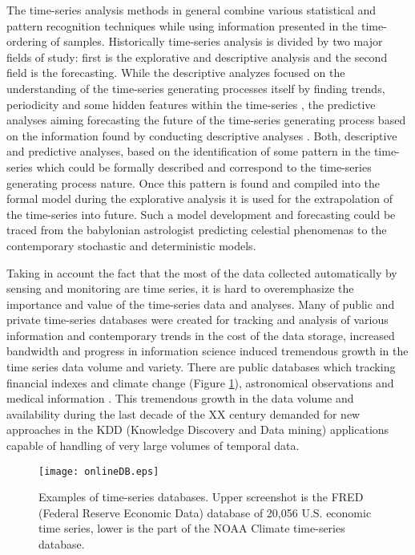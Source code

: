 The time-series analysis methods in general combine various statistical and pattern recognition techniques while using information presented in the time-ordering of samples. Historically time-series analysis is divided by two major fields of study: first is the explorative and descriptive analysis and the second field is the forecasting. 
While the descriptive analyzes focused on the understanding of the time-series generating processes itself by finding trends, periodicity and some hidden features within the time-series \cite{citeulike:2206845}, the predictive analyses aiming forecasting the future of the time-series generating process based on the information found by conducting descriptive analyses \cite{citeulike:3449765}. 
Both, descriptive and predictive analyses, based on the identification of some pattern in the time-series which could be formally described and correspond to the time-series generating process nature. Once this pattern is found and compiled into the formal model during the explorative analysis it is used for the extrapolation of the time-series into future. Such a model development and forecasting could be traced from the babylonian astrologist predicting celestial phenomenas to the contemporary stochastic and deterministic models.

Taking in account the fact that the most of the data collected automatically by sensing and monitoring are time series, it is hard to overemphasize the importance and value of the time-series data and analyses. Many of public and private time-series databases were created for tracking and analysis of various information and contemporary trends in the cost of the data storage, increased bandwidth and progress in information science induced tremendous growth in the time series data volume and variety. There are public databases which tracking financial indexes and climate change (Figure \ref{fig:onlineDB}), astronomical observations \cite{citeulike:4373331} and medical information \cite{citeulike:4373332}. This tremendous growth in the data volume and availability during the last decade of the XX century demanded for new approaches in the KDD (Knowledge Discovery and Data mining) applications capable of handling of very large volumes of temporal data.
\begin{figure}[tbp]
   \centering
   \texttt{[image: onlineDB.eps]}
   \caption{Examples of time-series databases. Upper screenshot is the FRED (Federal Reserve Economic Data) database of 20,056 U.S. economic time series, lower is the part of the NOAA Climate time-series database.}
   \label{fig:onlineDB}
\end{figure} 
